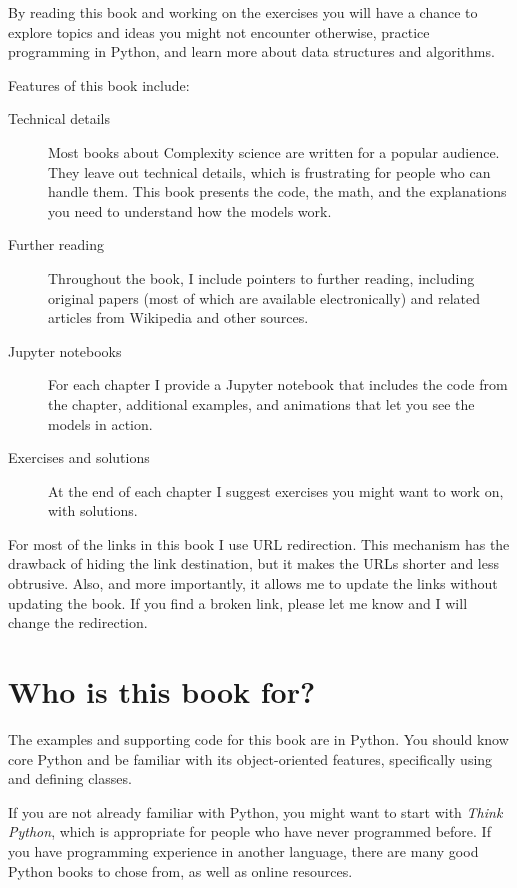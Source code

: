 \documentclass[12pt]{book}
\theoremstyle{exercise}
\begin{document}
By reading this book and working on the exercises you will have a chance to explore topics and ideas you might not encounter otherwise, practice programming in Python, and learn more about data structures and algorithms.

Features of this book include:

\begin{description}

\item[Technical details] Most books about Complexity science
  are written for a popular audience.  They leave out
  technical details, which is frustrating for people who can handle
  them.  This book presents the code, the math, and the explanations
  you need to understand how the models work.

\item[Further reading] Throughout the book, I include pointers to
  further reading, including original papers (most of which are
  available electronically) and related articles from Wikipedia and
  other sources.

\item[Jupyter notebooks] For each chapter I provide a Jupyter notebook
  that includes the code from the chapter, additional examples, and
  animations that let you see the models in action.

\item[Exercises and solutions] At the end of each chapter I suggest
  exercises you might want to work on, with solutions.

\end{description}

For most of the links in this book I use URL redirection.  This mechanism has the drawback of hiding the link destination, but it makes the URLs shorter and less obtrusive.  Also, and more importantly, it allows me to update the links without updating the book.  If you find a broken link, please let me know and I will change the redirection.


\section{Who is this book for?}

The examples and supporting code for this book are in Python.  You
should know core Python and be familiar with its object-oriented features,
specifically using and defining classes.


If you are not already familiar with Python, you might want to start
with {\it Think Python}, which is appropriate for people who have never programmed before.  If you have programming experience in another language, there are many good Python books to chose from, as well as online resources.
\end{document}
